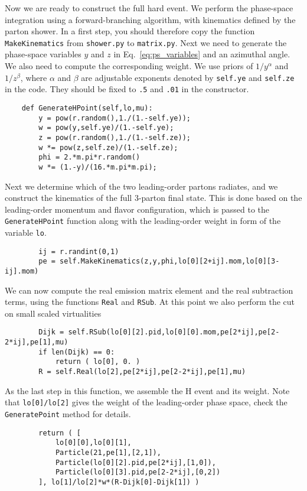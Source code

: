 \documentclass[10pt,fleqn]{scrartcl}
\begin{document}
Now we are ready to construct the full hard event. We perform the phase-space
integration using a forward-branching algorithm, with kinematics defined by 
the parton shower. In a first step, you should therefore copy the function
\verb!MakeKinematics! from {\tt shower.py} to {\tt matrix.py}. 
Next we need to generate the phase-space variables $y$ and $z$ in 
Eq.~\eqref{eq:ps_variables} and an azimuthal angle. We also need to compute 
the corresponding weight. We use priors of $1/y^\alpha$ and $1/z^\beta$, 
where $\alpha$ and $\beta$ are adjustable exponents denoted by \verb!self.ye! 
and \verb!self.ze! in the code. They should be fixed to \verb!.5! and 
\verb!.01! in the constructor.
\begin{verbatim}
    def GenerateHPoint(self,lo,mu):
        y = pow(r.random(),1./(1.-self.ye));
        w = pow(y,self.ye)/(1.-self.ye);
        z = pow(r.random(),1./(1.-self.ze));
        w *= pow(z,self.ze)/(1.-self.ze);
        phi = 2.*m.pi*r.random()
        w *= (1.-y)/(16.*m.pi*m.pi);
\end{verbatim}
Next we determine which of the two leading-order partons radiates,
and we construct the kinematics of the full 3-parton final state.
This is done based on the leading-order momentum and flavor configuration, 
which is passed to the \verb!GenerateHPoint! function along with the 
leading-order weight in form of the variable \verb!lo!.
\begin{verbatim}
        ij = r.randint(0,1)
        pe = self.MakeKinematics(z,y,phi,lo[0][2+ij].mom,lo[0][3-ij].mom)
\end{verbatim}
We can now compute the real emission matrix element and the real subtraction 
terms, using the functions \verb!Real! and \verb!RSub!. At this point 
we also perform the cut on small scaled virtualities
\begin{verbatim}
        Dijk = self.RSub(lo[0][2].pid,lo[0][0].mom,pe[2*ij],pe[2-2*ij],pe[1],mu)
        if len(Dijk) == 0:
            return ( lo[0], 0. )
        R = self.Real(lo[2],pe[2*ij],pe[2-2*ij],pe[1],mu)
\end{verbatim}
As the last step in this function, we assemble the H event and its weight.
Note that \verb!lo[0]/lo[2]! gives the weight of the leading-order phase space,
check the \verb!GeneratePoint! method for details.
\begin{verbatim}
        return ( [
            lo[0][0],lo[0][1],
            Particle(21,pe[1],[2,1]),
            Particle(lo[0][2].pid,pe[2*ij],[1,0]),
            Particle(lo[0][3].pid,pe[2-2*ij],[0,2])
        ], lo[1]/lo[2]*w*(R-Dijk[0]-Dijk[1]) )
\end{verbatim}
\end{document}
